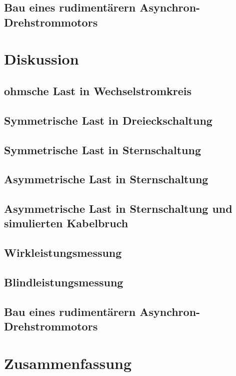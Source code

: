 \documentclass[12pt,english,ngerman]{scrartcl}
\begin{document}
\subsection{Bau eines rudimentärern Asynchron-Drehstrommotors}


\section{Diskussion}
\label{sec:diskussion}

\subsection{ohmsche Last in Wechselstromkreis}


\subsection{Symmetrische Last in Dreieckschaltung}


\subsection{Symmetrische Last in Sternschaltung}


\subsection{Asymmetrische Last in Sternschaltung}


\subsection{Asymmetrische Last in Sternschaltung und simulierten Kabelbruch}


\subsection{Wirkleistungsmessung}


\subsection{Blindleistungsmessung}


\subsection{Bau eines rudimentärern Asynchron-Drehstrommotors}

\section{Zusammenfassung}
\label{sec:zusammenfassung}
\end{document}
